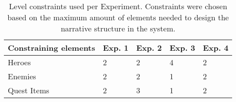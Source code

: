 \begin{table}[]
\centering
\caption{Level constraints used per Experiment. Constraints were chosen based on the maximum amount of elements needed to design the narrative structure in the system.}
\begin{tabular}{l|llll}
Constraining elements & Exp. 1 & Exp. 2 & Exp. 3 & Exp. 4 \\ \hline
Heroes                & 2            & 2            & 4            & 2            \\
Enemies               & 2            & 2            & 1            & 2            \\
Quest Items           & 2            & 3            & 1            & 2           
\end{tabular}
\label{tab:level-constraints}
\end{table}